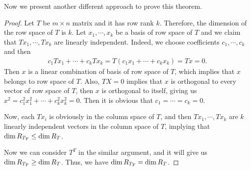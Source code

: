\documentclass[11pt]{book}
\theoremstyle{definition}
\numberwithin{equation}{chapter}
\begin{document}
Now we present another different approach to prove this theorem.

\begin{proof}
Let $T$ be $m\times n$ matrix and it has row rank $k$. Therefore, the dimension of the row space of $T$ is $k$. Let $x_1,\cdots,x_k$ be a basis of row space of $T$ and we claim that $Tx_1,\cdots, Tx_k$ are linearly independent. Indeed, we choose coefficients $c_1,\cdots,c_k$ and then 
\begin{align*}
    c_1 Tx_1 + \cdots + c_k Tx_k = T(c_1x_1 +\cdots + c_kx_k) = Tx = 0.
\end{align*}
Then $x$ is a linear combination of basis of row space of $T$, which implies that $x$ belongs to row space of $T$. Also, $TX = 0$ implies that $x$ is orthogonal to every vector of row space of $T$, then $x$ is orthogonal to itself, giving us $x^2 = c_1^2 x_1^2 + \cdots + c_k^2 x_k^2 = 0$. Then it is obvious that $c_1 = \cdots = c_k = 0$.

Now, each $Tx_i$ is obviously in the column space of $T$, and then $Tx_1,\cdots, Tx_k$ are $k$ linearly independent vectors in the column space of $T$, implying that ${\rm dim}\, R_{T_T}\leq {\rm dim}\,R_T$. 

Now we can consider $T^T$ in the similar argument, and it will give us ${\rm dim}\, R_{T_T}\geq {\rm dim}\,R_T$. Thus, we have ${\rm dim}\, R_{T_T} = {\rm dim}\,R_T$. 
\end{proof}

\medskip
\end{document}
